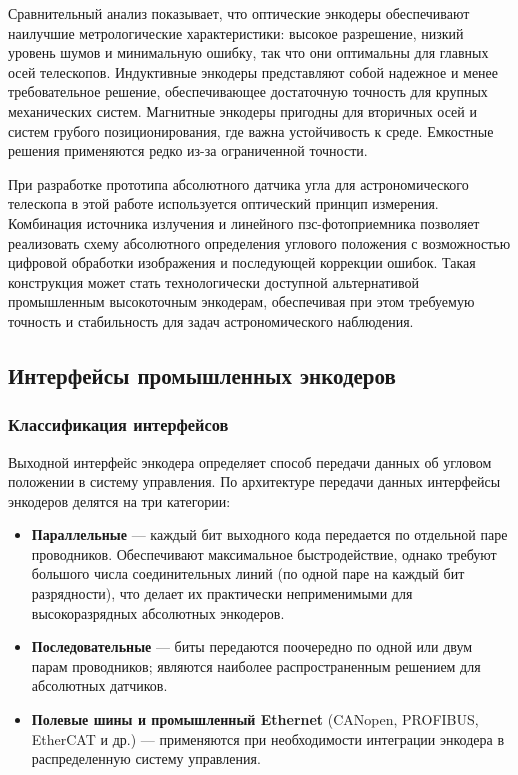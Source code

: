 Сравнительный анализ показывает, что оптические энкодеры обеспечивают наилучшие метрологические характеристики: высокое разрешение, низкий уровень шумов и минимальную ошибку, так что они оптимальны для главных осей телескопов. Индуктивные энкодеры представляют собой надежное и менее требовательное решение, обеспечивающее достаточную точность для крупных механических систем. Магнитные энкодеры пригодны для вторичных осей и систем грубого позиционирования, где важна устойчивость к среде. Емкостные решения применяются редко из-за ограниченной точности.  

При разработке прототипа абсолютного датчика угла для астрономического телескопа в этой работе используется оптический принцип измерения. Комбинация источника излучения и линейного пзс-фотоприемника позволяет реализовать схему абсолютного определения углового положения с возможностью цифровой обработки изображения и последующей коррекции ошибок. Такая конструкция может стать технологически доступной альтернативой промышленным высокоточным энкодерам, обеспечивая при этом требуемую точность и стабильность для задач астрономического наблюдения. 

\subsection{Интерфейсы промышленных энкодеров}

\subsubsection{Классификация интерфейсов}

Выходной интерфейс энкодера определяет способ передачи данных об угловом положении в систему управления. По архитектуре передачи данных интерфейсы энкодеров делятся на три категории:
\begin{itemize}
\item \textbf{Параллельные} --- каждый бит выходного кода передается по отдельной паре проводников. Обеспечивают максимальное быстродействие, однако требуют большого числа соединительных линий (по одной паре на каждый бит разрядности), что делает их практически неприменимыми для высокоразрядных абсолютных энкодеров.

\item \textbf{Последовательные} --- биты передаются поочередно по одной или двум парам проводников; являются наиболее распространенным решением для абсолютных датчиков.

\item \textbf{Полевые шины и промышленный Ethernet} (CANopen, PROFIBUS, EtherCAT и др.) — применяются при необходимости интеграции энкодера в распределенную систему управления.
\end{itemize}

